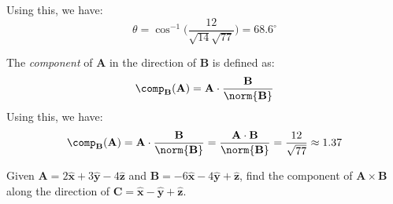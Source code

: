 \documentclass[crop=false,class=book,oneside]{standalone}
\begin{document}
\begin{solution}
\begin{minipage}{0.49\textwidth}
\begin{subequations}
                    \end{subequations}
                \end{minipage}
                \par\hfill\par
                Using this, we have:
                \begin{equation}
                    \theta=\cos^{-1}\bigg(
                        \frac{12}{\sqrt{14}{\sqrt{77}}}
                    \bigg)
                    =68.6^{\circ}
                \end{equation}
                \par\hfill\par
                The \textit{component} of $\mathbf{A}$
                in the direction of
                $\mathbf{B}$ is defined as:
                \begin{equation}
                    \comp_{\mathbf{B}}(\mathbf{A})
                    =\mathbf{A}\cdot
                    \frac{\mathbf{B}}
                         {\norm{\mathbf{B}}}
                \end{equation}
                Using this, we have:
                \begin{equation}
                    \comp_{\mathbf{B}}(\mathbf{A})
                    =\mathbf{A}\cdot\frac{\mathbf{B}}
                        {\norm{\mathbf{B}}}
                    =\frac{\mathbf{A}
                        \cdot\mathbf{B}}{\norm{\mathbf{B}}}
                    =\frac{12}{\sqrt{77}}
                    \approx{1.37}
                \end{equation}
            \end{solution}
            \begin{problem}
                Given 
                $\mathbf{A}=2\hat{\mathbf{x}}%
                 +3\hat{\mathbf{y}}-4\hat{\mathbf{z}}$
                and
                $\mathbf{B}%
                 =-6\hat{\mathbf{x}}-4\hat{\mathbf{y}}%
                 +\hat{\mathbf{z}}$,
                find the component of
                $\mathbf{A}\times\mathbf{B}$
                along the direction of
                $\mathbf{C}%
                 =\hat{\mathbf{x}}-\hat{\mathbf{y}}%
                 +\hat{\mathbf{z}}$.
            \end{problem}
\end{document}

